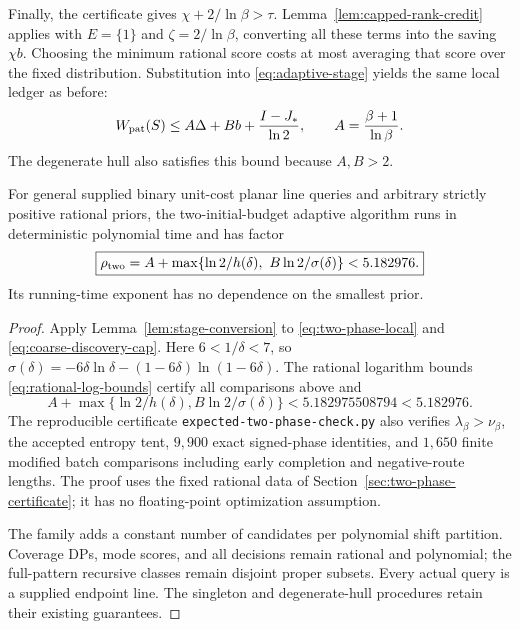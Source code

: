 Finally, the certificate gives $\chi+2/\ln\beta>\tau$.
Lemma~\ref{lem:capped-rank-credit} applies with $E=\{1\}$ and
$\zeta=2/\ln\beta$, converting all these terms into the saving
$\chi b$. Choosing the minimum rational score costs at most averaging
that score over the fixed distribution. Substitution into
\eqref{eq:adaptive-stage} yields the same local ledger as before:
\begin{equation}\label{eq:two-phase-local}
 W_{\rm pat}(S)\le A\Delta+B b+\frac{I-J_*}{\ln2},
 \qquad A=\frac{\beta+1}{\ln\beta}.
\end{equation}
The degenerate hull also satisfies this bound because $A,B>2$.

\begin{theorem}
\label{thm:two-phase-expected}
For general supplied binary unit-cost planar line queries and arbitrary
strictly positive rational priors, the two-initial-budget adaptive
algorithm runs in deterministic polynomial time and has factor
\[
 \boxed{\rho_{\rm two}=
 A+\max\{\ln2/h(\delta),\ B\ln2/\sigma(\delta)\}<5.182976.}
\]
Its running-time exponent has no dependence on the smallest prior.
\end{theorem}
\begin{proof}
Apply Lemma~\ref{lem:stage-conversion} to
\eqref{eq:two-phase-local} and \eqref{eq:coarse-discovery-cap}.
Here $6<1/\delta<7$, so
$\sigma(\delta)=-6\delta\ln\delta
 -(1-6\delta)\ln(1-6\delta)$.
The rational logarithm bounds \eqref{eq:rational-log-bounds} certify
all comparisons above and
\[
 A+\max\{\ln2/h(\delta),B\ln2/\sigma(\delta)\}
 <5.182975508794<5.182976.
\]
The reproducible certificate \texttt{expected-two-phase-check.py}
also verifies $\lambda_\beta>\nu_\beta$, the accepted entropy tent,
$9{,}900$ exact signed-phase identities, and $1{,}650$ finite modified
batch comparisons including early completion and negative-route
lengths. The proof uses the fixed rational data of
Section~\ref{sec:two-phase-certificate}; it has no floating-point
optimization assumption.

The family adds a constant number of candidates per polynomial shift
partition. Coverage DPs, mode scores, and all decisions remain
rational and polynomial; the full-pattern recursive classes remain
disjoint proper subsets. Every actual query is a supplied endpoint
line. The singleton and degenerate-hull procedures retain their
existing guarantees.
\end{proof}
